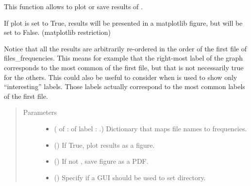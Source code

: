 \documentclass[letterpaper,10pt,english]{sphinxmanual}
\begin{document}
\begin{fulllineitems}
\label{\detokenize{utils:loacore.utils.plot_frequencies.frequencies_bar_chart}}
This function allows to plot or save results of {\hyperref[\detokenize{analysis:module-loacore.analysis.frequencies}]{}}.

If plot is set to True, results will be presented in a matplotlib figure, but  will be set to False.
(matplotlib restriction)

Notice that all the results are arbitrarily re-ordered in the order of the first file of files\_frequencies. This
means for example that the right-most label of the graph corresponds to the most common of the first file, but that
is not necessarily true for the others. This could also be useful to consider when  is used to show only
“interesting” labels. Those labels actually correspond to the  most common labels of the first file.
\begin{quote}\begin{description}
\item[{Parameters}] \leavevmode\begin{itemize}
\item {} 
 ( of  :  of label :  .) \textendash{} Dictionary that maps file names to frequencies.

\item {} 
 () \textendash{} If True, plot results as a figure.

\item {} 
 () \textendash{} If not , save figure as a PDF.

\item {} 
 () \textendash{} Specify if a GUI should be used to set directory.


\end{itemize}
\end{description}
\end{quote}
\end{fulllineitems}
\end{document}
